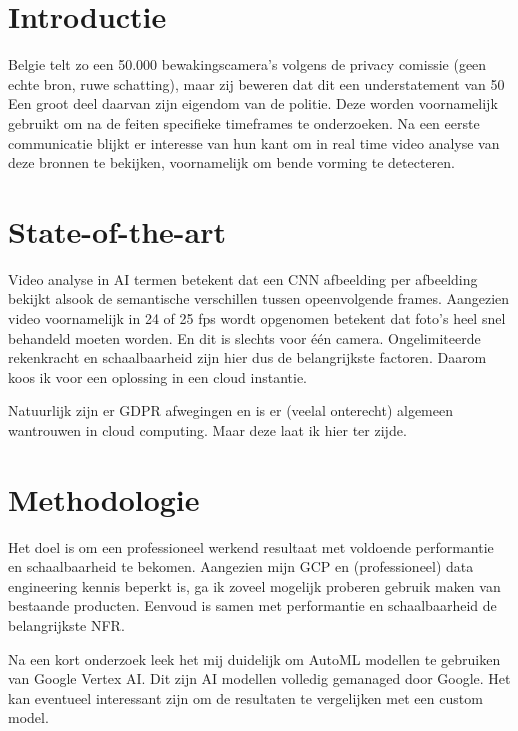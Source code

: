 
\section{Introductie}%
\label{sec:introductie}

Belgie telt zo een 50.000 bewakingscamera's volgens de privacy comissie (geen echte bron, ruwe schatting), maar zij beweren dat dit een understatement van 50%
Een groot deel daarvan zijn eigendom van de politie. Deze worden voornamelijk gebruikt om na de feiten specifieke timeframes te onderzoeken.
Na een eerste communicatie blijkt er interesse van hun kant om in real time video analyse van deze bronnen te bekijken, voornamelijk om bende vorming te detecteren.

\section{State-of-the-art}%
\label{sec:state-of-the-art}

Video analyse in AI termen betekent dat een CNN afbeelding per afbeelding bekijkt alsook de semantische verschillen tussen opeenvolgende frames.
Aangezien video voornamelijk in 24 of 25 fps wordt opgenomen betekent dat foto's heel snel behandeld moeten worden. En dit is slechts voor één camera.
Ongelimiteerde rekenkracht en schaalbaarheid zijn hier dus de belangrijkste factoren. Daarom koos ik voor een oplossing in een cloud instantie.

Natuurlijk zijn er GDPR afwegingen en is er (veelal onterecht) algemeen wantrouwen in cloud computing. Maar deze laat ik hier ter zijde.

\section{Methodologie}%
\label{sec:methodologie}

Het doel is om een professioneel werkend resultaat met voldoende performantie en schaalbaarheid te bekomen. Aangezien mijn GCP en (professioneel) data engineering kennis beperkt is,
ga ik zoveel mogelijk proberen gebruik maken van bestaande producten. Eenvoud is samen met performantie en schaalbaarheid de belangrijkste NFR.

Na een kort onderzoek leek het mij duidelijk om AutoML modellen te gebruiken van Google Vertex AI. Dit zijn AI modellen volledig gemanaged door Google.
Het kan eventueel interessant zijn om de resultaten te vergelijken met een custom model.

